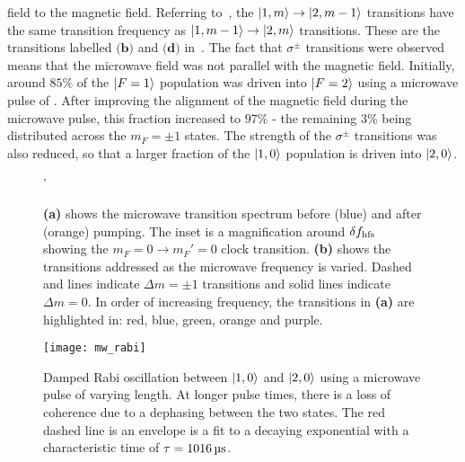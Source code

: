 field to the magnetic field. Referring
to~, the
$\ket{1,m}\rightarrow\ket{2,m-1}$
transitions have the same transition frequency as
$\ket{1,m-1}\rightarrow\ket{2,m}$
transitions. These are the transitions labelled $\textbf{(b)}$ and
$\textbf{(d)}$ in~. 
The fact that $\sigma^{\pm}$ transitions were observed means
that the microwave field was not parallel with the magnetic field.
Initially, around 
\(85\%\) of the $\ket{F=1}$ population was driven into \(\ket{F=2}\) using a
microwave pulse of . After improving the
alignment of the magnetic field during the microwave pulse, this
fraction increased to \(97\%\) - the remaining 3\% being distributed
across the \(m_F = \pm 1\) states. The strength of the $\sigma^{\pm}$
transitions was also reduced, so that a larger fraction of the
$\ket{1,0}$ population is driven into $\ket{2,0}$. 
\begin{figure}[!htbp]
    \centering
    \def\svgwidth{\columnwidth}
    \fontsize{14pt}{14pt}
    \subfloat[][]{\scalebox{0.5}{}\label{fig:microwave_spectrum}}
    \subfloat[][]{\scalebox{0.5}{\raisebox{4ex}{}}\label{fig:mw_spectrum_trans}}
    \caption[Microwave transition spectrum]{\textbf{(a)} shows the
      microwave transition spectrum before (blue) and after (orange)
     pumping. The inset is a magnification around $\delta
    f_\textnormal{hfs}$ showing the $m_F = 0 \rightarrow m_F' = 0$
    clock transition. \textbf{(b)} shows the transitions addressed
  as the microwave frequency is varied. Dashed and lines indicate
\(\Delta m = \pm 1\) transitions and solid lines indicate \(\Delta m =
0\). In order of increasing frequency, the transitions in \textbf{(a)} are highlighted in: red, blue, green, orange and purple.} 
    \label{fig:microwave_data}'
\end{figure}
\begin{figure}[!htbp]
    \centering
    \texttt{[image: mw\_rabi]}
    \caption[Microwave Rabi oscillation between \(\ket{1,0}\) and \(\ket{2,0}\)]{Damped Rabi oscillation between \(\ket{1,0}\) and \(\ket{2,0}\) using a microwave pulse of varying length. At longer pulse times, there is a loss of coherence due to a dephasing between the two states. The red dashed line is an envelope is a fit to a decaying exponential with a characteristic time of \(\tau = \sivalue{1016}{\micro\second}\).}
    \label{fig:mw_rabi}
\end{figure}

